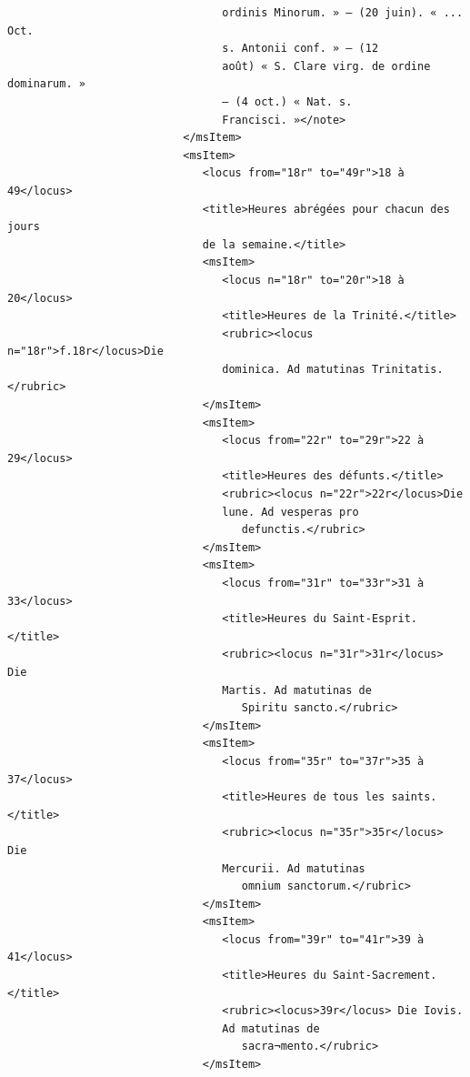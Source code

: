 \documentclass[a4paper,12pt,twoside]{book}
\begin{document}
\begin{verbatim}
                                 ordinis Minorum. » — (20 juin). « ... Oct. 
                                 s. Antonii conf. » — (12
                                 août) « S. Clare virg. de ordine dominarum. »
                                 — (4 oct.) « Nat. s.
                                 Francisci. »</note>
                           </msItem>
                           <msItem>
                              <locus from="18r" to="49r">18 à 49</locus>
                              <title>Heures abrégées pour chacun des jours 
                              de la semaine.</title>
                              <msItem>
                                 <locus n="18r" to="20r">18 à 20</locus>
                                 <title>Heures de la Trinité.</title>
                                 <rubric><locus n="18r">f.18r</locus>Die
                                 dominica. Ad matutinas Trinitatis.</rubric>
                              </msItem>
                              <msItem>
                                 <locus from="22r" to="29r">22 à 29</locus>
                                 <title>Heures des défunts.</title>
                                 <rubric><locus n="22r">22r</locus>Die 
                                 lune. Ad vesperas pro
                                    defunctis.</rubric>
                              </msItem>
                              <msItem>
                                 <locus from="31r" to="33r">31 à 33</locus>
                                 <title>Heures du Saint-Esprit.</title>
                                 <rubric><locus n="31r">31r</locus> Die 
                                 Martis. Ad matutinas de
                                    Spiritu sancto.</rubric>
                              </msItem>
                              <msItem>
                                 <locus from="35r" to="37r">35 à 37</locus>
                                 <title>Heures de tous les saints.</title>
                                 <rubric><locus n="35r">35r</locus> Die 
                                 Mercurii. Ad matutinas
                                    omnium sanctorum.</rubric>
                              </msItem>
                              <msItem>
                                 <locus from="39r" to="41r">39 à 41</locus>
                                 <title>Heures du Saint-Sacrement.</title>
                                 <rubric><locus>39r</locus> Die Iovis. 
                                 Ad matutinas de
                                    sacra¬mento.</rubric>
                              </msItem>

\end{verbatim}
\end{document}
